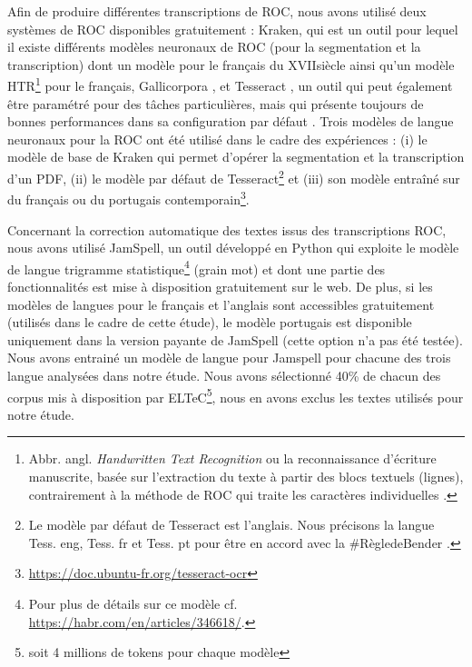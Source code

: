 Afin de produire différentes transcriptions de ROC, nous avons utilisé deux systèmes de ROC disponibles gratuitement : Kraken, qui est un outil pour lequel il existe différents modèles neuronaux de ROC (pour la segmentation et la transcription) dont un modèle pour le français du XVII\ieme{}siècle \cite{gabay:hal-02577236} ainsi qu'un modèle HTR\footnote{Abbr. angl. \textit{Handwritten Text Recognition} ou la reconnaissance d'écriture manuscrite, basée sur l'extraction du texte à partir des blocs textuels (lignes), contrairement à la méthode de ROC qui traite les caractères individuelles \cite{gabayscicos}.} pour le français, Gallicorpora \cite{pinche_2022_7410529}, et Tesseract \cite{smith2007overview}, un outil qui peut également être paramétré pour des tâches particulières, mais qui présente toujours de bonnes performances dans sa configuration par défaut \cite{clausner2020efficient}.
Trois modèles de langue neuronaux pour la ROC ont été utilisé dans le cadre des expériences : (i) le modèle de base de Kraken qui permet d'opérer la segmentation et la transcription d'un PDF, (ii) le modèle par défaut de Tesseract\footnote{Le modèle par défaut de Tesseract est l'anglais. Nous précisons la langue Tess. eng, Tess. fr et Tess. pt pour être en accord avec la \#RègledeBender \cite{bender-friedman-2018-data}.} et (iii) son modèle entraîné sur du français ou du portugais contemporain\footnote{\url{https://doc.ubuntu-fr.org/tesseract-ocr}}.
 

Concernant la correction automatique des textes issus des transcriptions ROC, nous avons utilisé JamSpell, un outil développé en Python qui exploite le modèle de langue trigramme statistique\footnote{Pour plus de détails sur ce modèle cf. \url{https://habr.com/en/articles/346618/}.} (grain mot) et dont une partie des fonctionnalités est mise à disposition gratuitement sur le web.
De plus, si les modèles de langues pour le français et l'anglais sont accessibles gratuitement (utilisés dans le cadre de cette étude), le modèle portugais est disponible uniquement dans la version payante de JamSpell (cette option n'a pas été testée).
Nous avons entrainé un modèle de langue pour Jamspell pour chacune des trois langue analysées dans notre étude. Nous avons sélectionné 40\% de chacun des corpus mis à disposition par ELTeC\footnote{soit 4 millions de tokens pour chaque modèle}, nous en avons exclus les textes utilisés pour notre étude.

